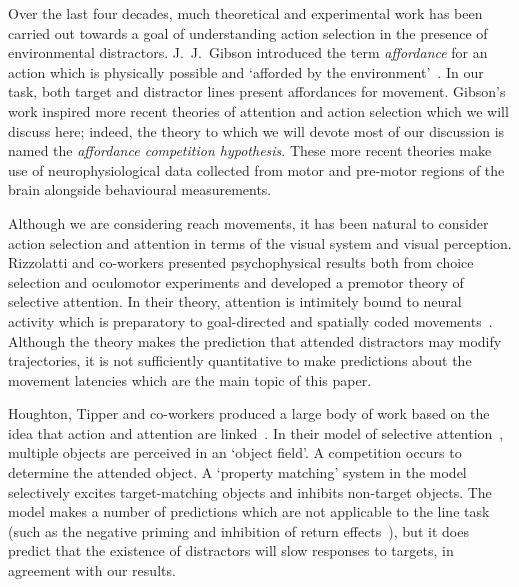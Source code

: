 \documentclass[10pt,letterpaper]{article}
\begin{document}
Over the last four decades, much theoretical and experimental work has
been carried out towards a goal of understanding action selection in
the presence of environmental distractors. J.~J.~Gibson introduced the
term \emph{affordance} for an action which is physically possible and
`afforded by the environment'~\cite{gibson_ecological_1979}. In our
task, both target and distractor lines present affordances for
movement. Gibson's work inspired more recent theories of attention and
action selection which we will discuss here; indeed, the theory to
which we will devote most of our discussion is named the
\emph{affordance competition hypothesis}. These more recent theories
make use of neurophysiological data collected from motor and pre-motor
regions of the brain alongside behavioural measurements.

Although we are considering reach movements, it has been natural to
consider action selection and attention in terms of the visual system
and visual perception. Rizzolatti and co-workers presented
psychophysical results both from choice selection and oculomotor
experiments and developed a premotor theory of selective attention. In
their theory, attention is intimitely bound to neural activity which
is preparatory to goal-directed and spatially coded
movements~\cite{rizzolatti_space_1994}. Although the theory makes the
prediction that attended distractors may modify trajectories, it is
not sufficiently quantitative to make predictions about the movement
latencies which are the main topic of this paper.

Houghton, Tipper and co-workers produced a large body of work based on
the idea that action and attention are
linked~\cite{tipper_selective_1992,
  houghton_model_1994,houghton_inhibition_1996,tipper_selective_1997,
  tipper_actionbased_1998,tipper_reaching_2001}. In their model of
selective
attention~\cite{houghton_model_1994,houghton_inhibition_1996},
multiple objects are perceived in an `object field'. A competition
occurs to determine the attended object. A `property matching' system
in the model selectively excites target-matching objects and inhibits
non-target objects. The model makes a number of predictions which are
not applicable to the line task (such as the negative priming and
inhibition of return effects~\cite{houghton_model_1994}), but it does
predict that the existence of distractors will slow responses to
targets, in agreement with our results.
\end{document}
